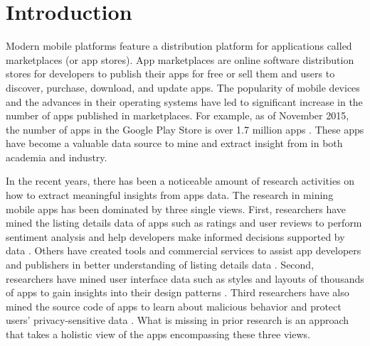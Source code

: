 \chapter{Introduction}
\label{ch:intro__chapter}
Modern mobile platforms feature a distribution platform for applications called marketplaces (or app stores).
App marketplaces are online software distribution stores for developers to publish their apps for free or sell them and users to discover, purchase, download, and update apps.
The popularity of mobile devices and the advances in their operating systems have led to significant increase in the number of apps published in marketplaces.
For example, as of November 2015, the number of apps in the Google Play Store is over 1.7 million apps \cite{appbrain_play_apps}.
These apps have become a valuable data source to mine and extract insight from in both academia and industry.

In the recent years, there has been a noticeable amount of research activities on how to extract meaningful insights from apps data. 
The research in mining mobile apps has been dominated by three single views.
First, researchers have mined the listing details data of apps such as ratings and user reviews to perform sentiment analysis and help developers make informed decisions supported by data \cite{fu_2013_KDD,chen_2014_ICSE,kong_2015_CCS}. 
Others have created tools and commercial services to assist app developers and publishers in better understanding of listing details data \cite{appfigures,applause,appannie}.
Second, researchers have mined user interface data such as styles and layouts of thousands of apps to gain insights into their design patterns \cite{shirazi_EICS_2013,Alharbi_2015_MobileHCI}.
Third researchers have also mined the source code of apps to learn about malicious behavior and protect users' privacy-sensitive data \cite{zhou_2012_SP_dissecting,lu_2012_CCS,Arzt_2014_PLDI}.
What is missing in prior research is an approach that takes a holistic view of the apps encompassing these three views. 


